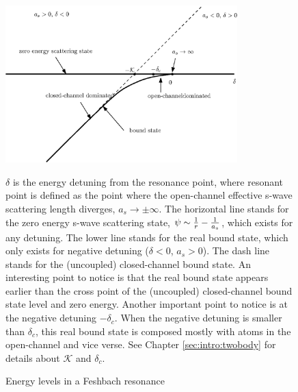 

\begin{figure}[htbp]
\begin{center}
\includegraphics[width=0.8\textwidth]{levels}
\caption{Energy levels in a Feshbach resonance\label{fig:intro:levels}} 
\parbox{0.7\textwidth}{\small $\delta$ is the energy detuning from the resonance point, where resonant point is defined as the point where the open-channel effective s-wave scattering length diverges, $a_s\to\pm\infty$.  The horizontal line stands for the zero energy s-wave scattering state, $\psi\sim\frac{1}{r}-\frac{1}{a_s}$, which exists for any detuning.  The lower line stands for the real bound state, which only exists for negative detuning ($\delta<0$, $a_s>0$). The dash line stands for the (uncoupled) closed-channel bound state.  An interesting point to notice is that the real bound state appears earlier than the cross point of the (uncoupled) closed-channel bound state level and zero energy. Another important point to notice is at the negative detuning $-\delta_c$.  When the negative detuning is smaller than $\delta_c$, this real bound state is composed mostly with atoms in the open-channel and vice verse.  See Chapter \ref{sec:intro:twobody} for details about $\mathcal{K}$ and $\delta_c$.   }

\end{center}
\end{figure}

